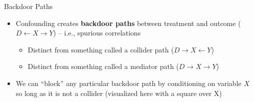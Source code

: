 \documentclass{beamer}
\begin{document}
\begin{frame}{Backdoor Paths}

  \begin{itemize}
    \item Confounding creates \textbf{backdoor paths} between treatment and outcome ($D\leftarrow X\rightarrow Y$) -- i.e., spurious correlations
		\begin{itemize}
		\item Distinct from something called a collider path ($D \rightarrow X \leftarrow Y$)
		\item Distinct from something called a mediator path ($D \rightarrow X \rightarrow Y$)
		\end{itemize}
    \item We can ``block'' any particular backdoor path by conditioning on variable $X$ so long as it is not a collider (visualized here with a square over X)

  \end{itemize}

  \begin{center}
  \end{center}

\end{frame}
\end{document}
